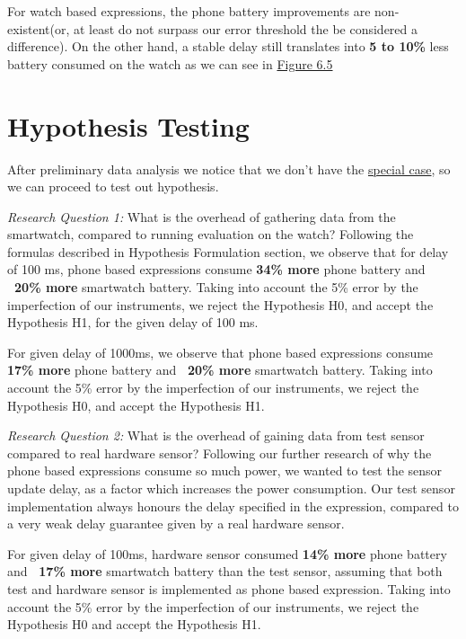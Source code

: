 For watch based expressions, the phone battery improvements are non-existent(or, at least do not surpass our error threshold the be considered a difference). On the other hand,
a stable delay still translates into \textbf{ 5 to 10\%} less battery consumed on the watch as we can see in \hyperref[fig:wear_expr_consumption]{Figure 6.5}

\section{Hypothesis Testing}
After preliminary data analysis we notice that we don't have the \hyperref[special_case]{special case}, so we can proceed to test out hypothesis.

\textit{Research Question 1:} What is the overhead of gathering data from the smartwatch, compared to running evaluation on the watch? \newline
Following the formulas described in Hypothesis Formulation section, we observe that for delay of 100 ms, phone based expressions consume 
\textbf{34\% more} phone battery and \textbf{~20\% more } smartwatch battery. Taking into account the 5\% error by the imperfection of our instruments,
we reject the Hypothesis H0, and accept the Hypothesis H1, for the given delay of 100 ms.

For given delay of 1000ms, we observe that  phone based expressions consume 
\textbf{17\% more} phone battery and \textbf{~20\% more } smartwatch battery. Taking into account the 5\% error by the imperfection of our instruments,
we reject the Hypothesis H0, and accept the Hypothesis H1.

 \textit{Research Question 2:}  What is the overhead of gaining data from test sensor compared to real hardware sensor?\newline
Following our further research of why the phone based expressions consume so much power, we wanted to test the sensor update delay, as a factor
which increases the power consumption. Our test sensor implementation always honours the delay specified in the expression, compared to a very weak delay guarantee
given by a real hardware sensor.

For given delay of 100ms, hardware sensor consumed \textbf{14\% more} phone battery and \textbf{~17\% more } smartwatch battery than the test sensor, assuming that both test and hardware
sensor is implemented as phone based expression.
Taking into account the 5\% error by the imperfection of our instruments, we reject the Hypothesis H0 and accept the Hypothesis H1.

